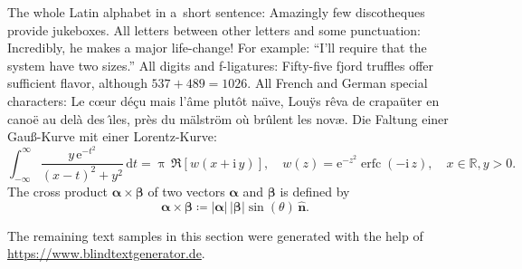 \documentclass[11pt, a4paper, oneside]{article}
\theoremstyle{Plain}
\theoremstyle{Definition}
\theoremstyle{Remark}
\begin{document}
The whole Latin alphabet in a~short sentence: Amazingly few discotheques provide jukeboxes. All letters between other letters and some punctuation: Incredibly, he makes a major life-change! For example: ``I'll require that the system have two sizes.'' All digits and f-ligatures: Fifty-five fjord truffles offer sufficient flavor, although ${537 + 489 = 1026}$. All French and German special characters: Le c\oe ur d\'e\c cu mais l'\^ame plut\^ot na\"\i ve, Lou\"ys r\^eva de crapa\"uter en cano\"e au del\`a des \^\i les, pr\`es du m\"alstr\"om o\`u br\^ulent les nov\ae. Die Faltung einer Gau\ss-Kurve mit einer Lorentz-Kurve:
\begin{equation}
\int_{-\infty}^\infty \frac{y\,\mathrm{e}^{-t^2}}{(x-t)^2+y^2}\,\mathrm{d} t =
\uppi \, \Re[w(x + \mathrm{i}\,y)], \quad w(z) = \mathrm{e}^{-z^2} \operatorname{erfc}(-\mathrm{i}\, z), \quad x \in \mathbb{R}, y>0.
\end{equation}
The cross product $\bm{\alpha} \times \bm{\beta}$ of two vectors $\bm{\alpha}$ and $\bm{\beta}$ is defined by
\begin{equation}
	\bm{\alpha} \times \bm{\beta} \coloneq |\bm{\alpha}| \, |\bm{\beta}| \sin (\theta) \, \hat{\bm{n}}.
\end{equation}

The remaining text samples in this section were generated with the help of \url{https://www.blindtextgenerator.de}.
\end{document}
